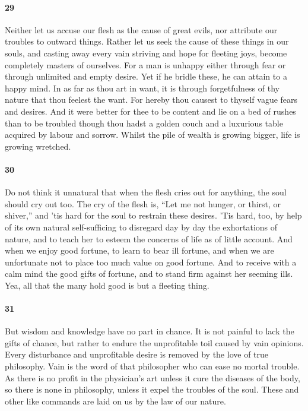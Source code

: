 \documentclass[12pt]{article}
\begin{document}
\paragraph{29} Neither let us accuse our flesh as the cause of great evils, nor
attribute our troubles to outward things. Rather let us seek the cause of these
things in our souls, and casting away every vain striving and hope for fleeting
joys, become completely masters of ourselves. For a man is unhappy either
through fear or through unlimited and empty desire. Yet if he bridle these, he
can attain to a happy mind. In as far as thou art in want, it is through
forgetfulness of thy nature that thou feelest the want. For hereby thou causest
to thyself vague fears and desires. And it were better for thee to be content
and lie on a bed of rushes than to be troubled though thou hadst a golden couch
and a luxurious table acquired by labour and sorrow. Whilst the pile of wealth
is growing bigger, life is growing wretched.

\paragraph{30} Do not think it unnatural that when the flesh cries out for
anything, the soul should cry out too. The cry of the flesh is, ``Let me not
hunger, or thirst, or shiver,'' and 'tis hard for the soul to restrain these
desires. 'Tis hard, too, by help of its own natural self-sufficing to disregard
day by day the exhortations of nature, and to teach her to esteem the concerns
of life as of little account. And when we enjoy good fortune, to learn to bear
ill fortune, and when we are unfortunate not to place too much value on good
fortune. And to receive with a calm mind the good gifts of fortune, and to
stand firm against her seeming ills. Yea, all that the many hold good is but a
fleeting thing.

\paragraph{31} But wisdom and knowledge have no part in chance. It is not
painful to lack the gifts of chance, but rather to endure the unprofitable toil
caused by vain opinions. Every disturbance and unprofitable desire is removed
by the love of true philosophy. Vain is the word of that philosopher who can
ease no mortal trouble. As there is no profit in the physician's art unless it
cure the diseases of the body, so there is none in philosophy, unless it expel
the troubles of the soul. These and other like commands are laid on us by the
law of our nature.
\end{document}

